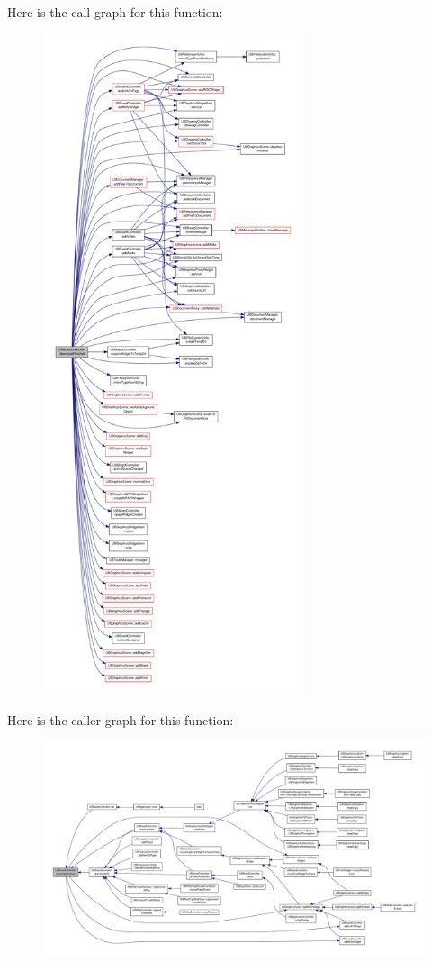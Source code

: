 Here is the call graph for this function\-:
\nopagebreak
\begin{figure}[H]
\begin{center}
\leavevmode
\includegraphics[height=550pt]{d7/d62/class_u_b_board_controller_ab6cbc7bda85279e7eee5c5923892dd1a_cgraph}
\end{center}
\end{figure}




Here is the caller graph for this function\-:
\nopagebreak
\begin{figure}[H]
\begin{center}
\leavevmode
\includegraphics[width=350pt]{d7/d62/class_u_b_board_controller_ab6cbc7bda85279e7eee5c5923892dd1a_icgraph}
\end{center}
\end{figure}


